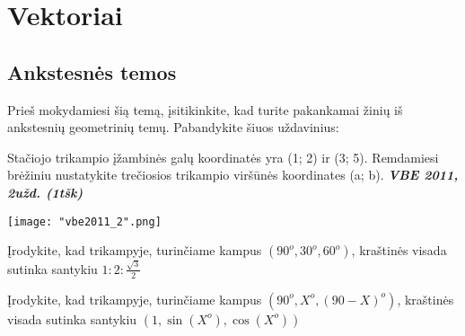\documentclass[a4paper]{article}
\newcommand{\tbf}[1]{\textbf{#1}}
\newcommand{\tit}[1]{\textit{#1}}
\begin{document}
\section{Vektoriai}
\subsection{Ankstesnės temos}
Prieš mokydamiesi šią temą, įsitikinkite, kad turite pakankamai žinių iš ankstesnių geometrinių temų. Pabandykite šiuos uždavinius:
\begin{enumerate}

\begin{minipage}[b]{0.6\linewidth}
\item Stačiojo trikampio įžambinės galų koordinatės yra (1; 2) ir (3; 5).
Remdamiesi brėžiniu nustatykite trečiosios trikampio viršūnės koordinates (a; b).
\tbf{\tit{VBE 2011, 2užd. (1tšk)}}
\end{minipage}
\hspace{\fill} \begin{minipage}{0.23\linewidth} \texttt{[image: "vbe2011\_2".png]}\end{minipage}
\item Įrodykite, kad trikampyje, turinčiame kampus $(90^o, 30^o, 60^o)$, kraštinės visada sutinka santykiu $1:2:\frac{\sqrt{3}}{2}$
\item Įrodykite, kad trikampyje, turinčiame kampus $(90^o,X^o, (90-X)^o)$, kraštinės visada sutinka santykiu $(1, \sin (X^o), \cos (X^o))$
\end{enumerate}
\end{document}
